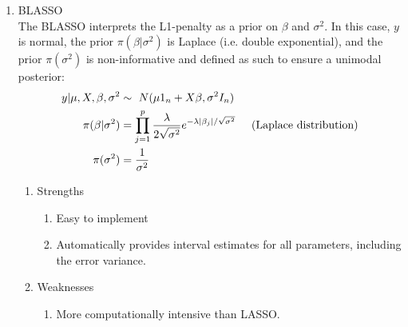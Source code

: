 \documentclass[11pt,letterpaper]{article}
\begin{document}
\begin{enumerate}
      \item BLASSO \\
      The BLASSO interprets the L1-penalty as a prior on $\beta$ and $\sigma^2$. In this 
      case, $y$ is normal, the prior $\pi(\beta|\sigma^2)$ is Laplace (i.e. double
      exponential), and the prior $\pi(\sigma^2)$ is non-informative and defined as such to 
      ensure a 
      unimodal posterior:
      \begin{align*}
      y|\mu,X,\beta,\sigma^2 &\sim\ N(\mu1_n+X\beta,\sigma^2I_n) \\
      \pi(\beta|\sigma^2)&=\prod\limits_{j=1}^p \frac{\lambda}{2\sqrt{\sigma^2}}e^{-\lambda
        |\beta_j|/\sqrt{\sigma^2}} \hspace{5mm}\text{(Laplace distribution)}\\
      \pi(\sigma^2)&=\frac{1}{\sigma^2}
      \end{align*}
      \begin{enumerate}
        \item Strengths
              \begin{enumerate}
                \item Easy to implement
                \item Automatically provides interval estimates for all parameters, 
                  including the error variance.
              \end{enumerate}
        \item Weaknesses
              \begin{enumerate}
                \item More computationally intensive than LASSO.
              \end{enumerate}
      \end{enumerate}
      

\end{enumerate}
\end{document}
